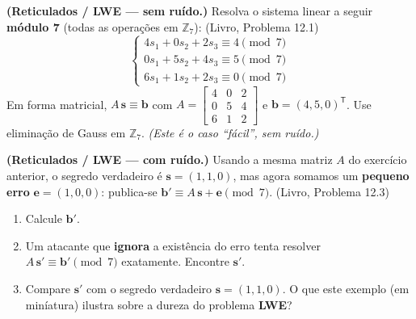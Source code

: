 \documentclass[11pt,a4paper]{article}
\newcommand{\livro}[1]{{\footnotesize\color{black!50}(Livro, Problema #1)}}
\begin{document}
\begin{exercicio}
\textbf{(Reticulados / LWE --- sem ru\'{i}do.)} Resolva o sistema linear a seguir \textbf{m\'{o}dulo 7} (todas as opera\c{c}\~{o}es em $\mathbb{Z}_7$): \livro{12.1}
\[
\begin{cases}
4s_1 + 0s_2 + 2s_3 \equiv 4 \pmod 7\\
0s_1 + 5s_2 + 4s_3 \equiv 5 \pmod 7\\
6s_1 + 1s_2 + 2s_3 \equiv 0 \pmod 7
\end{cases}
\]
Em forma matricial, $A\,\mathbf{s} \equiv \mathbf{b}$ com $A=\left[\begin{smallmatrix}4&0&2\\0&5&4\\6&1&2\end{smallmatrix}\right]$ e $\mathbf{b}=(4,5,0)^{\mathsf T}$. Use elimina\c{c}\~{a}o de Gauss em $\mathbb{Z}_7$. \emph{(Este \'{e} o caso ``f\'{a}cil'', sem ru\'{i}do.)}
\end{exercicio}

\begin{exercicio}
\textbf{(Reticulados / LWE --- com ru\'{i}do.)} Usando a mesma matriz $A$ do exerc\'{i}cio anterior, o segredo verdadeiro \'{e} $\mathbf{s} = (1,1,0)$, mas agora somamos um \textbf{pequeno erro} $\mathbf{e} = (1,0,0)$: publica-se $\mathbf{b}' \equiv A\,\mathbf{s} + \mathbf{e} \pmod 7$. \livro{12.3}
\begin{enumerate}[label=(\alph*)]
    \item Calcule $\mathbf{b}'$.
    \item Um atacante que \textbf{ignora} a exist\^{e}ncia do erro tenta resolver $A\,\mathbf{s}' \equiv \mathbf{b}' \pmod 7$ exatamente. Encontre $\mathbf{s}'$.
    \item Compare $\mathbf{s}'$ com o segredo verdadeiro $\mathbf{s}=(1,1,0)$. O que este exemplo (em min\'{i}atura) ilustra sobre a dureza do problema \textbf{LWE}?
\end{enumerate}
\end{exercicio}
\end{document}
